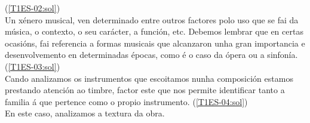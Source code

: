 %
    {%
    (\ref{T1ES-02:sol}) {\color{orange}{\hrulefill}}
    \\ \small{%
    Un xénero musical, ven determinado entre outros factores polo uso que se fai da música, o contexto, o seu carácter, a función, etc. Debemos lembrar que en certas ocasións, fai referencia a formas musicais que alcanzaron unha gran importancia e desenvolvemento en determinadas épocas, como é o caso da ópera ou a sinfonía. 
    {\color{orange}{\hrulefill}}
    }
    }
%
%
    {%
    (\ref{T1ES-03:sol}) {\color{orange}{\hrulefill}}
    \\ \small{%
    Cando analizamos os instrumentos que escoitamos nunha composición estamos prestando atención ao timbre, factor este que nos permite identificar tanto a familia á que pertence como o propio instrumento.
    {\color{orange}{\hrulefill}}
    }
    }
%
%
    {%
    (\ref{T1ES-04:sol}) {\color{orange}{\hrulefill}}
    \\ \small{%
    En este caso, analizamos a textura da obra.
{\color{orange}{\hrulefill}}
    }
    }

